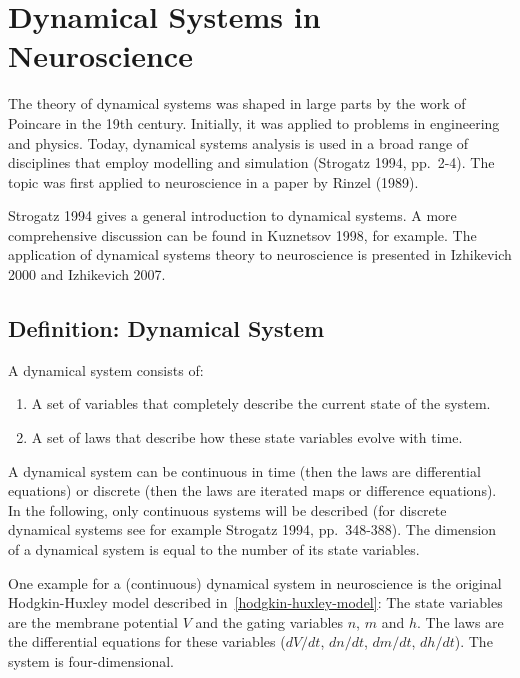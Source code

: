 \documentclass[12pt,a4paper,]{report}
\begin{document}
\section{Dynamical Systems in Neuroscience}\label{dynamical-systems}

The theory of dynamical systems was shaped in large parts by the work of
Poincare in the 19th century. Initially, it was applied to problems in
engineering and physics. Today, dynamical systems analysis is used in a
broad range of disciplines that employ modelling and simulation
(Strogatz 1994, pp.~2-4). The topic was first applied to neuroscience in
a paper by Rinzel (1989).

Strogatz 1994 gives a general introduction to dynamical systems. A more
comprehensive discussion can be found in Kuznetsov 1998, for example.
The application of dynamical systems theory to neuroscience is presented
in Izhikevich 2000 and Izhikevich 2007.

\subsection{Definition: Dynamical
System}\label{definition-dynamical-system}

A dynamical system consists of:

\begin{enumerate}
\def\labelenumi{\arabic{enumi}.}
\itemsep1pt\parskip0pt
\item
  A set of variables that completely describe the current state of the
  system.
\item
  A set of laws that describe how these state variables evolve with
  time.
\end{enumerate}

A dynamical system can be continuous in time (then the laws are
differential equations) or discrete (then the laws are iterated maps or
difference equations). In the following, only continuous systems will be
described (for discrete dynamical systems see for example Strogatz 1994,
pp.~348-388). The dimension of a dynamical system is equal to the number
of its state variables.

One example for a (continuous) dynamical system in neuroscience is the
original Hodgkin-Huxley model described in~\ref{hodgkin-huxley-model}:
The state variables are the membrane potential $V$ and the gating
variables $n$, $m$ and $h$. The laws are the differential equations for
these variables ($dV/dt$, $dn/dt$, $dm/dt$, $dh/dt$). The system is
four-dimensional.
\end{document}
